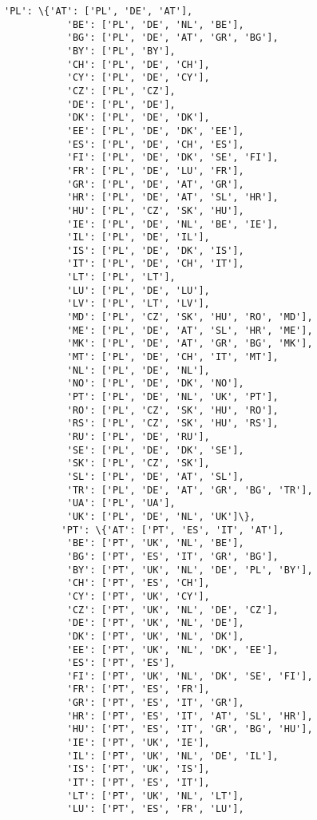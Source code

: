 \documentclass[11pt]{article}
\begin{document}
\begin{Verbatim}[commandchars=\\\{\}]
          'PL': \{'AT': ['PL', 'DE', 'AT'],
           'BE': ['PL', 'DE', 'NL', 'BE'],
           'BG': ['PL', 'DE', 'AT', 'GR', 'BG'],
           'BY': ['PL', 'BY'],
           'CH': ['PL', 'DE', 'CH'],
           'CY': ['PL', 'DE', 'CY'],
           'CZ': ['PL', 'CZ'],
           'DE': ['PL', 'DE'],
           'DK': ['PL', 'DE', 'DK'],
           'EE': ['PL', 'DE', 'DK', 'EE'],
           'ES': ['PL', 'DE', 'CH', 'ES'],
           'FI': ['PL', 'DE', 'DK', 'SE', 'FI'],
           'FR': ['PL', 'DE', 'LU', 'FR'],
           'GR': ['PL', 'DE', 'AT', 'GR'],
           'HR': ['PL', 'DE', 'AT', 'SL', 'HR'],
           'HU': ['PL', 'CZ', 'SK', 'HU'],
           'IE': ['PL', 'DE', 'NL', 'BE', 'IE'],
           'IL': ['PL', 'DE', 'IL'],
           'IS': ['PL', 'DE', 'DK', 'IS'],
           'IT': ['PL', 'DE', 'CH', 'IT'],
           'LT': ['PL', 'LT'],
           'LU': ['PL', 'DE', 'LU'],
           'LV': ['PL', 'LT', 'LV'],
           'MD': ['PL', 'CZ', 'SK', 'HU', 'RO', 'MD'],
           'ME': ['PL', 'DE', 'AT', 'SL', 'HR', 'ME'],
           'MK': ['PL', 'DE', 'AT', 'GR', 'BG', 'MK'],
           'MT': ['PL', 'DE', 'CH', 'IT', 'MT'],
           'NL': ['PL', 'DE', 'NL'],
           'NO': ['PL', 'DE', 'DK', 'NO'],
           'PT': ['PL', 'DE', 'NL', 'UK', 'PT'],
           'RO': ['PL', 'CZ', 'SK', 'HU', 'RO'],
           'RS': ['PL', 'CZ', 'SK', 'HU', 'RS'],
           'RU': ['PL', 'DE', 'RU'],
           'SE': ['PL', 'DE', 'DK', 'SE'],
           'SK': ['PL', 'CZ', 'SK'],
           'SL': ['PL', 'DE', 'AT', 'SL'],
           'TR': ['PL', 'DE', 'AT', 'GR', 'BG', 'TR'],
           'UA': ['PL', 'UA'],
           'UK': ['PL', 'DE', 'NL', 'UK']\},
          'PT': \{'AT': ['PT', 'ES', 'IT', 'AT'],
           'BE': ['PT', 'UK', 'NL', 'BE'],
           'BG': ['PT', 'ES', 'IT', 'GR', 'BG'],
           'BY': ['PT', 'UK', 'NL', 'DE', 'PL', 'BY'],
           'CH': ['PT', 'ES', 'CH'],
           'CY': ['PT', 'UK', 'CY'],
           'CZ': ['PT', 'UK', 'NL', 'DE', 'CZ'],
           'DE': ['PT', 'UK', 'NL', 'DE'],
           'DK': ['PT', 'UK', 'NL', 'DK'],
           'EE': ['PT', 'UK', 'NL', 'DK', 'EE'],
           'ES': ['PT', 'ES'],
           'FI': ['PT', 'UK', 'NL', 'DK', 'SE', 'FI'],
           'FR': ['PT', 'ES', 'FR'],
           'GR': ['PT', 'ES', 'IT', 'GR'],
           'HR': ['PT', 'ES', 'IT', 'AT', 'SL', 'HR'],
           'HU': ['PT', 'ES', 'IT', 'GR', 'BG', 'HU'],
           'IE': ['PT', 'UK', 'IE'],
           'IL': ['PT', 'UK', 'NL', 'DE', 'IL'],
           'IS': ['PT', 'UK', 'IS'],
           'IT': ['PT', 'ES', 'IT'],
           'LT': ['PT', 'UK', 'NL', 'LT'],
           'LU': ['PT', 'ES', 'FR', 'LU'],

\end{Verbatim}
\end{document}
